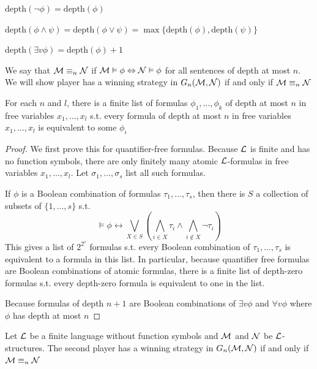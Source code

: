 \documentclass[11pt]{article}
\begin{document}
\(\text{depth}(\neg\phi)=\text{depth}(\phi)\)

\(\text{depth}(\phi\wedge\psi)=\text{depth}(\phi\vee\psi)=
    \max\{\text{depth}(\phi),\text{depth}(\psi)\}\)

\(\text{depth}(\exists v\phi)=\text{depth}(\phi)+1\)

We say that \(\mathcal{M}\equiv_n\mathcal{N}\) if
\(\mathcal{M}\vDash\phi\Leftrightarrow\mathcal{N}\vDash\phi\) for all sentences of
depth at most \(n\). We will show player  has a winning strategy in
\(G_n(\mathcal{M},\mathcal{N})\) if and only if \(\mathcal{M}\equiv_n\mathcal{N}\)

\begin{lemma}[]
For each \(n\) and \(l\), there is a finite list of formulas
\(\phi_1,\dots,\phi_k\) of depth at most \(n\) in free variables
\(x_1,\dots,x_l\) s.t. every formula of depth at most \(n\) in free variables
\(x_1,\dots,x_l\) is equivalent to some \(\phi_i\)
\end{lemma}

\begin{proof}
We first prove this for quantifier-free formulas. Because \(\mathcal{L}\) is
finite and has no function symbols, there are only finitely many atomic
\(\mathcal{L}\)-formulas in free variables \(x_1,\dots,x_l\). Let
\(\sigma_1,\dots,\sigma_s\) list all such formulas.

If \(\phi\) is a Boolean combination of formulas \(\tau_1,\dots,\tau_s\), then
there is \(S\) a collection of subsets of \(\{1,\dots,s\}\) s.t.
\begin{equation*}
\vDash\phi\leftrightarrow\displaystyle
\bigvee_{X\in S}\left(\bigwedge_{i\in X}\tau_i\wedge
\bigwedge_{i\not\in X}\neg\tau_i
\right)
\end{equation*}
This gives a list of \(2^{2^s}\) formulas s.t. every Boolean combination of
\(\tau_1,\dots,\tau_s\) is equivalent to a formula in this list. In
particular, because quantifier free formulas are Boolean combinations of
atomic formulas, there is a finite list of depth-zero formulas s.t. every
depth-zero formula is equivalent to one in the list.

Because formulas of depth \(n+1\) are Boolean combinations of 
\(\exists v\phi\) and \(\forall v\phi\) where \(\phi\) has depth at most \(n\)
\end{proof}

\begin{lemma}[]
Let \(\mathcal{L}\) be a finite language without function symbols and \(\mathcal{M}\)
and \(\mathcal{N}\) be \(\mathcal{L}\)-structures. The second player has a winning
strategy in \(G_n(\mathcal{M},\mathcal{N})\) if and only if \(\mathcal{M}\equiv_n\mathcal{N}\)
\end{lemma}
\end{document}
